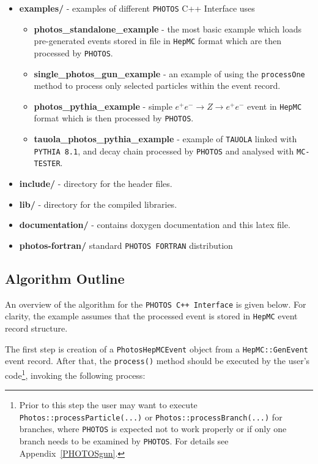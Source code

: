 \documentclass[]{Photos_interface_design}
\begin{document}
\begin{itemize}
  \item {\bf examples/ } - examples of different {\tt PHOTOS} C++ Interface uses
    \begin{itemize}
	\item {\bf photos\_standalone\_example} - the most basic example which loads pre-generated 
	      events stored in file in {\tt HepMC} format which are then processed by {\tt PHOTOS}.
	\item {\bf single\_photos\_gun\_example} - an example of using the {\tt processOne} method
	      to process only selected particles within the event record.
    \item {\bf photos\_pythia\_example} - simple $e^+e^- \rightarrow Z \rightarrow e^+e^-$ event in
	{\tt HepMC} format which is then processed by {\tt PHOTOS}.
    \item {\bf tauola\_photos\_pythia\_example } - example of  {\tt TAUOLA} linked with {\tt PYTHIA 8.1},
	and decay chain processed by {\tt PHOTOS} and analysed with  {\tt MC-TESTER}.
    \end{itemize}   
  \item {\bf include/} - directory for the header files.
  \item {\bf lib/ } - directory for the compiled  libraries. 
  \item {\bf documentation/ } - contains doxygen documentation and this latex file.
  \item {\bf photos-fortran/ } standard {\tt PHOTOS FORTRAN} distribution
\end{itemize}

\subsection{Algorithm Outline}
\label{sect:Outline}

An overview of the algorithm for  the {\tt PHOTOS C++ Interface} is
given below. For clarity, the example assumes that the processed event
is stored in {\tt HepMC} event record structure.

The first step is creation of a {\tt PhotosHepMCEvent} object from
a {\tt HepMC::GenEvent} event record. After that, the {\tt process()} method should
be executed by the user's code\footnote{Prior to this step
the user may want to execute {\tt Photos::processParticle(...)} or {\tt Photos::processBranch(...)}
for branches, where {\tt PHOTOS} is expected not to work properly or if only one branch
needs to be examined by {\tt PHOTOS}. For details see Appendix~\ref{PHOTOSgun}.
}, invoking the following process:
\end{document}
